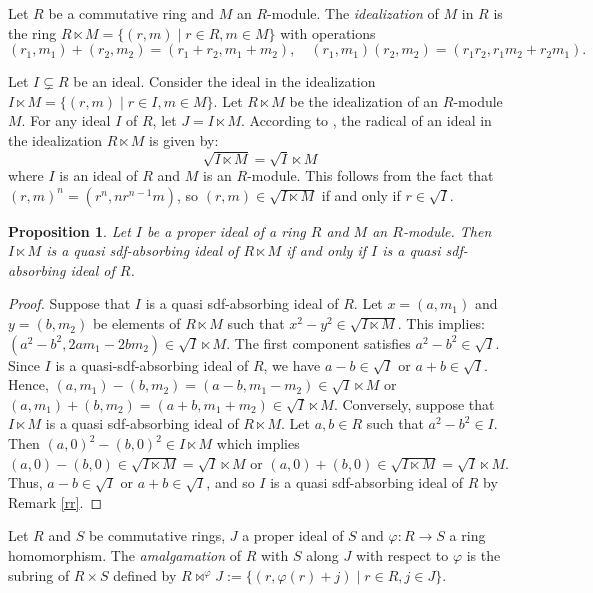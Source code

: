\documentclass{amsart}%
\newtheorem{proposition}{Proposition}[section]
\begin{document}
Let $R$ be a commutative ring and $M$ an $R$-module. The \emph{idealization}
of $M$ in $R$ is the ring $R \ltimes M = \{ (r,m) \mid r \in R, m \in M \} $
with operations
\[
(r_{1}, m_{1}) + (r_{2}, m_{2}) = (r_{1} + r_{2}, m_{1} + m_{2}), \quad(r_{1},
m_{1})(r_{2}, m_{2}) = (r_{1} r_{2}, r_{1} m_{2} + r_{2} m_{1}).
\]


Let $I\subsetneq R$ be an ideal. Consider the ideal in the idealization
$I\ltimes M=\{(r,m)\mid r\in I,m\in M\}.$ Let $R\ltimes M$ be the idealization
of an $R$-module $M$. For any ideal $I$ of $R$, let $J=I\ltimes M$. According
to \cite[Theorem 3.2]{Anderson2009}, the radical of an ideal in the
idealization $R\ltimes M$ is given by:
\[
\sqrt{I\ltimes M}=\sqrt{I}\ltimes M
\]
where $I$ is an ideal of $R$ and $M$ is an $R$-module. This follows from the
fact that $(r,m)^{n}=(r^{n},nr^{n-1}m)$, so $(r,m)\in\sqrt{I\ltimes M}$ if and
only if $r\in\sqrt{I}$.

\begin{proposition}
Let $I$ be a proper ideal of a ring $R$ and $M$ an $R$-module. Then $I\ltimes
M$ is a quasi sdf-absorbing ideal of $R\ltimes M$ if and only if $I$ is a
quasi sdf-absorbing ideal of $R$.
\end{proposition}

\begin{proof}
Suppose that $I$ is a quasi sdf-absorbing ideal of $R.$ Let $x=(a,m_{1})$ and
$y=(b,m_{2})$ be elements of $R\ltimes M$ such that $x^{2}-y^{2}\in
\sqrt{I\ltimes M}$. This implies: $(a^{2}-b^{2},2am_{1}-2bm_{2})\in\sqrt
{I}\ltimes M.$ The first component satisfies $a^{2}-b^{2}\in\sqrt{I}$. Since
$I$ is a quasi-sdf-absorbing ideal of $R$, we have $a-b\in\sqrt{I}$ or
$a+b\in\sqrt{I}$. Hence, $(a,m_{1})-(b,m_{2})=(a-b,m_{1}-m_{2})\in\sqrt
{I}\ltimes M$ or $(a,m_{1})+(b,m_{2})=(a+b,m_{1}+m_{2})\in\sqrt{I}\ltimes M$.
Conversely, suppose that $I\ltimes M$ is a quasi sdf-absorbing ideal of
$R\ltimes M.$ Let $a,b\in R$ such that $a^{2}-b^{2}\in I$. Then $(a,0)^{2}%
-(b,0)^{2}\in I\ltimes M$ which implies $(a,0)-(b,0)\in\sqrt{I\ltimes M}%
=\sqrt{I}\ltimes M$ or $(a,0)+(b,0)\in\sqrt{I\ltimes M}=\sqrt{I}\ltimes M$.
Thus, $a-b\in\sqrt{I}$ or $a+b\in\sqrt{I}$, and so $I$ is a quasi
sdf-absorbing ideal of $R$ by Remark \ref{rr}.
\end{proof}

Let $R$ and $S$ be commutative rings, $J $ a proper ideal of $S$ and $\varphi:
R \to S$ a ring homomorphism. The \emph{amalgamation} of $R$ with $S$ along
$J$ with respect to $\varphi$ is the subring of $R \times S$ defined by $R
\bowtie^{\varphi}J := \{ (r, \varphi(r) + j) \mid r \in R, j \in J \}. $
\end{document}
